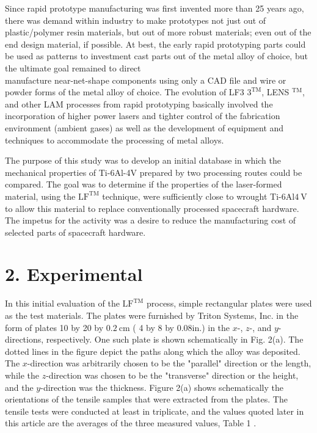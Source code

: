\documentclass[10pt]{article}
\begin{document}
Since rapid prototype manufacturing was first invented more than 25 years ago, there was demand within industry to make prototypes not just out of plastic/polymer resin materials, but out of more robust materials; even out of the end design material, if possible. At best, the early rapid prototyping parts could be used as patterns to investment cast parts out of the metal alloy of choice, but the ultimate goal remained to direct\\
manufacture near-net-shape components using only a CAD file and wire or powder forms of the metal alloy of choice. The evolution of LF3 $3^{\mathrm{TM}}$, LENS ${ }^{\mathrm{TM}}$, and other LAM processes from rapid prototyping basically involved the incorporation of higher power lasers and tighter control of the fabrication environment (ambient gases) as well as the development of equipment and techniques to accommodate the processing of metal alloys.

The purpose of this study was to develop an initial database in which the mechanical properties of Ti-6Al-4V prepared by two processing routes could be compared. The goal was to determine if the properties of the laser-formed material, using the $\mathrm{LF}^{\mathrm{TM}}$ technique, were sufficiently close to wrought Ti-6Al$4 \mathrm{~V}$ to allow this material to replace conventionally processed spacecraft hardware. The impetus for the activity was a desire to reduce the manufacturing cost of selected parts of spacecraft hardware.

\section*{2. Experimental}
In this initial evaluation of the $\mathrm{LF}^{\mathrm{TM}}$ process, simple rectangular plates were used as the test materials. The plates were furnished by Triton Systems, Inc. in the form of plates 10 by 20 by $0.2 \mathrm{~cm}$ ( 4 by 8 by $0.08 \mathrm{in}$.) in the $x$-, $z$-, and $y$-directions, respectively. One such plate is shown schematically in Fig. 2(a). The dotted lines in the figure depict the paths along which the alloy was deposited. The $x$-direction was arbitrarily chosen to be the "parallel" direction or the length, while the $z$-direction was chosen to be the "transverse" direction or the height, and the $y$-direction was the thickness. Figure 2(a) shows schematically the orientations of the tensile samples that were extracted from the plates. The tensile tests were conducted at least in triplicate, and the values quoted later in this article are the averages of the three measured values, Table 1 .
\end{document}

